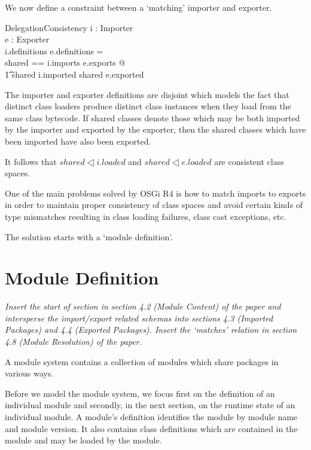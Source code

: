 \documentclass[a4paper,9pt]{article}
\begin{document}
We now define a constraint between a `matching' importer and exporter.
\begin{schema}{DelegationConsistency}
  i : Importer \\
  e : Exporter \\
\where
  i.definitions \cap e.definitions = \emptyset \\
  \LET shared == i.imports \cap e.exports @ \\
\t1 shared \dres i.imported \subseteq shared \dres e.exported \\
\end{schema}
The importer and exporter definitions are disjoint which models the
fact that distinct class loaders produce distinct class
instances when they load from the same class bytecode.
If shared classes denote those which may be both imported by the importer and
exported by the exporter, then the shared classes which have been imported
have also been exported.

It follows that $shared \dres i.loaded$ and $shared \dres e.loaded$ are
consistent class spaces.

One of the main problems solved by OSGi R4 is how to match imports to
exports in order to maintain proper consistency of class spaces
and avoid certain kinds of type mismatches resulting in class loading
failures, class cast exceptions, etc.

The solution starts with a `module definition'.

\clearpage
\section{Module Definition}
\label{cha:moduledef}
\textit{Insert the start of section in section 4.2 (Module Content)
of the paper
and intersperse the import/export related schemas into sections
4.3 (Imported Packages) and 4.4 (Exported Packages).
Insert the `matches' relation in section 4.8 (Module Resolution) of the paper.}

A module system contains a collection of modules which share packages
in various ways.

Before we model the module system, we focus first on the definition of an
individual module and secondly, in the next section, on the runtime state of
an individual module.
A module's definition identifies the module by module  name and
module version.
It also contains class definitions which are contained
in the module and may be loaded by the module.
\end{document}
